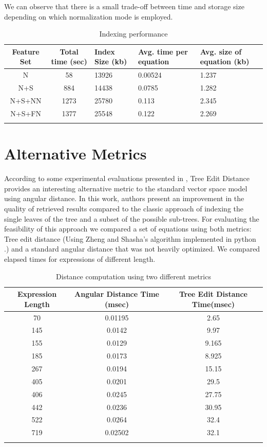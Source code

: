 We can observe that there is a small trade-off between time and storage size depending on which normalization mode is employed.

\begin{longtable}{|c|c|p{2cm}|p{2cm}|p{2cm}|}
\hline 
Feature Set & Total time (sec) & Index Size (kb) & Avg. time per equation & Avg. size of equation (kb) \\ 
\hline 
N & 58 & 13926 & 0.00524 & 1.237 \\ 
\hline 
N+S & 884 & 14438 & 0.0785 & 1.282 \\ 
\hline 
N+S+NN & 1273 & 25780 & 0.113 & 2.345 \\ 
\hline 
N+S+FN & 1377 & 25548 & 0.122 & 2.269 \\ 
\hline
\caption{Indexing performance}
\label{indexing_performance}
\end{longtable} 



\section{Alternative Metrics}
According to some experimental evaluations presented in \cite{tree_comparison}, Tree Edit Distance provides an interesting alternative metric to the standard vector space model using angular distance. In this work, authors present an improvement in the quality of retrieved results compared to the classic approach of indexing the single leaves of the tree and a subset of the possible sub-trees. For evaluating the feasibility of this approach we compared a set of equations using both metrics: Tree edit distance (Using Zheng and Shasha's algorithm implemented in python \cite{tree_distance_python}.) and a standard angular distance that was not heavily optimized. We compared elapsed times for expressions of different length.



\begin{longtable}{|c|c|c|}
\hline 
Expression Length & Angular Distance Time (msec) & Tree Edit Distance Time(msec) \\ \hline 
70 & 0.01195 & 2.65  \\ \hline
145 & 0.0142 & 9.97  \\ \hline
155 & 0.0129 & 9.165  \\ \hline
185 & 0.0173 & 8.925  \\ \hline
267 & 0.0194 & 15.15  \\ \hline
405 & 0.0201 & 29.5  \\ \hline
406 & 0.0245 & 27.75  \\ \hline
442 & 0.0236 & 30.95  \\ \hline
522 & 0.0264 & 32.4  \\ \hline
719 & 0.02502 & 32.1 \\ \hline

\caption{Distance computation using two different metrics}
\label{comparison_tree_times}
\end{longtable} 

